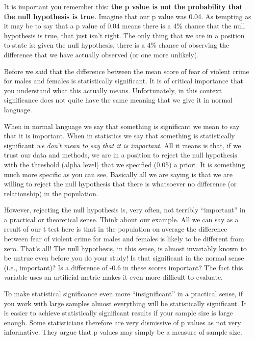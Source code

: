 \documentclass[]{book}
\theoremstyle{definition}
\theoremstyle{definition}
\theoremstyle{definition}
\theoremstyle{remark}
\begin{document}
It is important you remember this: \textbf{the p value is not the
probability that the null hypothesis is true}. Imagine that our p value
was 0.04. As tempting as it may be to say that a p value of 0.04 means
there is a 4\% chance that the null hypothesis is true, that just isn't
right. The only thing that we are in a position to state is: given the
null hypothesis, there is a 4\% chance of observing the difference that
we have actually observed (or one more unlikely).

Before we said that the difference between the mean score of fear of
violent crime for males and females is statistically significant. It is
of critical importance that you understand what this actually means.
Unfortunately, in this context significance does not quite have the same
meaning that we give it in normal language.

When in normal language we say that something is significant we mean to
say that it is important. When in statistics we say that something is
statistically significant \emph{we don't mean to say that it is
important}. All it means is that, if we trust our data and methods, we
are in a position to reject the null hypothesis with the threshold
(alpha level) that we specified (0.05) a priori. It is something much
more specific as you can see. Basically all we are saying is that we are
willing to reject the null hypothesis that there is whatsoever no
difference (or relationship) in the population.

However, rejecting the null hypothesis is, very often, not terribly
``important'' in a practical or theoretical sense. Think about our
example. All we can say as a result of our t test here is that in the
population on average the difference between fear of violent crime for
males and females is likely to be different from zero. That's all! The
null hypothesis, in this sense, is almost invariably known to be untrue
even before you do your study! Is that significant in the normal sense
(i.e., important)? Is a difference of -0.6 in these scores important?
The fact this variable uses an artificial metric makes it even more
difficult to evaluate.

To make statistical significance even more ``insignificant'' in a
practical sense, if you work with large samples almost everything will
be statistically significant. It is easier to achieve statistically
significant results if your sample size is large enough. Some
statisticians therefore are very dismissive of p values as not very
informative. They argue that p values may simply be a measure of sample
size.
\end{document}
